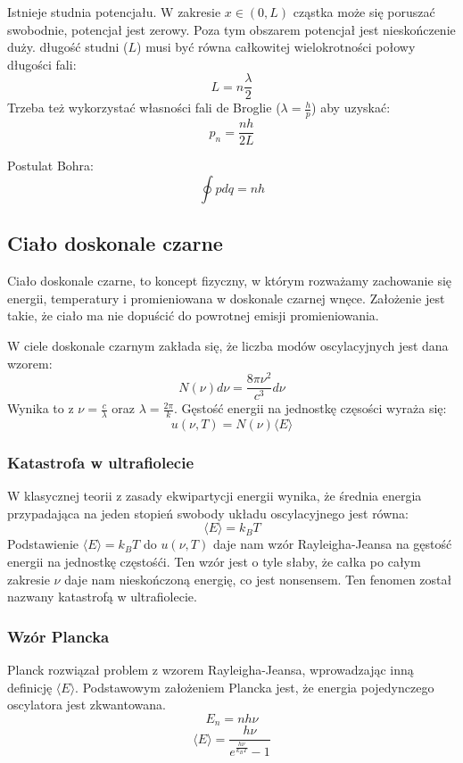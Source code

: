 \documentclass{../notatki}
\begin{document}
Istnieje studnia potencjału. W zakresie $x \in (0, L)$ cząstka może się poruszać
swobodnie, potencjał jest zerowy. Poza tym obszarem potencjał jest
nieskończenie duży. długość studni ($L$) musi być równa całkowitej
wielokrotności połowy długości fali:
$$
L = n\frac{\lambda}{2}
$$
Trzeba też wykorzystać własności fali de Broglie
($\lambda=\frac{h}{p}$) aby uzyskać:
$$
p_n = \frac{nh}{2L}
$$

Postulat Bohra:
$$
\oint pdq = nh
$$

\subsection{Ciało doskonale czarne}

Ciało doskonale czarne, to koncept fizyczny, w którym rozważamy zachowanie się
energii, temperatury i promieniowana w doskonale czarnej wnęce. Założenie jest
takie, że ciało ma nie dopuścić do powrotnej emisji promieniowania.

W ciele doskonale czarnym zakłada się, że liczba modów oscylacyjnych jest dana
wzorem:
$$
N(\nu)d\nu = \frac{8\pi\nu^2}{c^3}d\nu
$$
Wynika to z $\nu = \frac{c}{\lambda}$ oraz $\lambda = \frac{2\pi}{k}$.
Gęstość energii na jednostkę częsości wyraża się:
$$
u(\nu, T) = N(\nu)\langle E \rangle
$$

\subsubsection{Katastrofa w ultrafiolecie}

W klasycznej teorii z zasady ekwipartycji energii wynika, że średnia
energia przypadająca na jeden stopień swobody układu oscylacyjnego jest równa:
$$
\langle E \rangle = k_BT
$$
Podstawienie $\langle E \rangle = k_BT$ do $u(\nu, T)$ daje nam wzór
Rayleigha-Jeansa na gęstość energii na jednostkę częstośći. Ten wzór jest
o tyle słaby, że całka po całym zakresie $\nu$ daje nam nieskończoną energię,
co jest nonsensem. Ten fenomen został nazwany katastrofą w ultrafiolecie.

\subsubsection{Wzór Plancka}

Planck rozwiązał problem z wzorem Rayleigha-Jeansa, wprowadzając inną
definicję $\langle E \rangle$. Podstawowym założeniem Plancka jest, że energia
pojedynczego oscylatora jest zkwantowana.
$$
E_n = nh\nu
$$
$$
\langle E \rangle = \frac{h\nu}{e^{\frac{h\nu}{k_BT}} - 1}
$$
\end{document}
